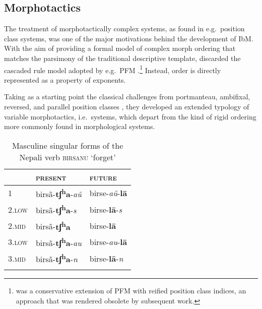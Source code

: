 \documentclass[output=paper,biblatex,babelshorthands,newtxmath,draftmode,colorlinks,citecolor=brown]{langscibook}
\begin{document}
\begin{exe}
\begin{xlist}
\begin{exe}
\begin{xlist}
\subsection{Morphotactics}
\label{sec:Mortax}

The treatment of morphotactically complex systems, as found in e.g.\
position class systems, was one of the major motivations behind the
development of IbM. With the aim of providing a formal model of
complex morph ordering that matches the parsimony of the traditional
descriptive template, \citet{Crysmann:Bonami:2016} discarded the
cascaded rule model adopted by e.g.\ PFM
\citep{Stump01}.\footnote{\citet{Crysmann12} was a conservative
  extension of PFM with reified position class indices, an approach
  that was rendered obsolete by subsequent work.} Instead, order is
directly represented as a property of exponents.

Taking as a starting point the classical challenges from
\citet{Stump93} \emdash portmanteau, ambifixal, reversed, and parallel
position classes \emdash, they developed an extended typology of variable
morphotactics, i.e.\ systems, which depart from the kind of rigid
ordering more commonly found in morphological systems.

\begin{table}[ht!]
\centering
    \begin{tabular}{lll}
      \lsptoprule
      & \textsc{present} & \textsc{future}\\
      \midrule
      1 & birsã-\textbf{tʃ\textsuperscript{h}a}-\emph{aũ} & 
                                                                birse-\emph{aũ}-\textbf{lā}\\
      \textsc{2.low} &
                 birsã-\textbf{tʃ\textsuperscript{h}a}-\emph{s} & 
                                                                      birse-\textbf{lā}-\emph{s}\\
      \textsc{2.mid} & 
                  birsã-\textbf{tʃ\textsuperscript{h}a} & 
                                                         birse-\textbf{lā}\\
      \textsc{3.low} & 
                  birsã-\textbf{tʃ\textsuperscript{h}a}-\emph{au} & 
                                                                        birse-\emph{au}-\textbf{lā}\\
      \textsc{3.mid} &
                 birsã-\textbf{tʃ\textsuperscript{h}a}-\emph{n} & 
                                                                      birse-\textbf{lā}-\emph{n}\\
      \lspbottomrule
    \end{tabular}
\caption{Masculine singular forms of the Nepali verb \textsc{birsanu} `forget'}
\label{tab:Nepali}
\end{table}


\end{xlist}
\end{exe}
\end{xlist}
\end{exe}
\end{document}
